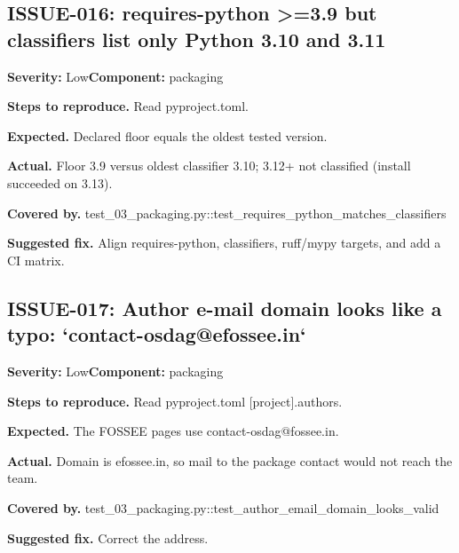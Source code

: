 \subsection*{ISSUE-016: requires-python >=3.\allowbreak{}9 but classifiers list only Python 3.\allowbreak{}10 and 3.\allowbreak{}11}
\textbf{Severity:} Low\quad \textbf{Component:} packaging\par
\textbf{Steps to reproduce.} Read pyproject.\allowbreak{}toml.\allowbreak{}\par
\textbf{Expected.} Declared floor equals the oldest tested version.\allowbreak{}\par
\textbf{Actual.} Floor 3.\allowbreak{}9 versus oldest classifier 3.\allowbreak{}10; 3.\allowbreak{}12+ not classified (install succeeded on 3.\allowbreak{}13).\allowbreak{}\par
\textbf{Covered by.} test\_\allowbreak{}03\_\allowbreak{}packaging.\allowbreak{}py::\allowbreak{}test\_\allowbreak{}requires\_\allowbreak{}python\_\allowbreak{}matches\_\allowbreak{}classifiers\par
\textbf{Suggested fix.} Align requires-python, classifiers, ruff/\allowbreak{}mypy targets, and add a CI matrix.\allowbreak{}

\subsection*{ISSUE-017: Author e-mail domain looks like a typo: `contact-osdag@efossee.\allowbreak{}in`}
\textbf{Severity:} Low\quad \textbf{Component:} packaging\par
\textbf{Steps to reproduce.} Read pyproject.\allowbreak{}toml [project].\allowbreak{}authors.\allowbreak{}\par
\textbf{Expected.} The FOSSEE pages use contact-osdag@fossee.\allowbreak{}in.\allowbreak{}\par
\textbf{Actual.} Domain is efossee.\allowbreak{}in, so mail to the package contact would not reach the team.\allowbreak{}\par
\textbf{Covered by.} test\_\allowbreak{}03\_\allowbreak{}packaging.\allowbreak{}py::\allowbreak{}test\_\allowbreak{}author\_\allowbreak{}email\_\allowbreak{}domain\_\allowbreak{}looks\_\allowbreak{}valid\par
\textbf{Suggested fix.} Correct the address.\allowbreak{}

